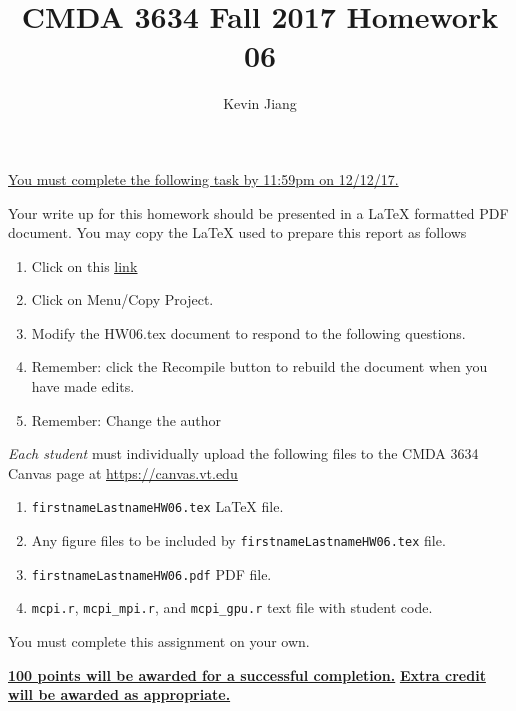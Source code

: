 \documentclass{article}
\newcommand{\pad}{\vspace{8pt}\noindent}
\newcommand{\myhref}[2]{\href{#1}{\color{foo}\underline{#2}\color{black}}}
\begin{document}
\title{CMDA 3634 Fall 2017 Homework 06}

\author{Kevin Jiang}
\vspace{-64pt}\maketitle
\begin{center}\underline{You must complete the following task by 11:59pm on 12/12/17.}\end{center}
Your write up for this homework should be presented in a {\LaTeX} formatted PDF document. You may copy the \LaTeX{} used to prepare this report as follows

\begin{enumerate}
\item Click on this  \myhref{https://www.sharelatex.com/read/vhrnbscgwfxk}{link} 
\item Click on Menu/Copy Project.
\item Modify the HW06.tex document to respond to the following questions. 
\item Remember: click the Recompile button to rebuild the document when you have made edits.
\item Remember: Change the author 
\end{enumerate}

\pad \emph{Each student} must individually upload the following files to the CMDA 3634 Canvas page at \myhref{https://canvas.vt.edu}{https://canvas.vt.edu}

\begin{enumerate}
\item \verb|firstnameLastnameHW06.tex| {\LaTeX} file.
\item Any figure files to be included by \verb|firstnameLastnameHW06.tex| file.
\item \verb|firstnameLastnameHW06.pdf| PDF file.
\item \verb|mcpi.r|, \verb|mcpi_mpi.r|, and \verb|mcpi_gpu.r| text file with student code. 
\end{enumerate}


\pad You must complete this assignment on your own. 

\vspace{16pt}
\begin{center}
\underline{\bf 100 points will be awarded for a successful completion.}
\vspace{8pt}\underline{\bf Extra credit will be awarded as appropriate.}
\end{center}
\end{document}
